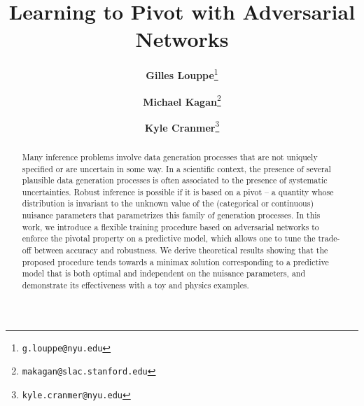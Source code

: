 \documentclass[twocolumn,superscriptaddress,aps]{revtex4-1}
\theoremstyle{plain}
\begin{document}

\title{\Large{Learning to Pivot with Adversarial Networks}}
\vspace{1cm}
\author{\small{\bf Gilles Louppe}\thanks{\texttt{g.louppe@nyu.edu}}}
\author{\small{\bf Michael Kagan}\thanks{\texttt{makagan@slac.stanford.edu}}}
\author{\small{\bf Kyle Cranmer}\thanks{\texttt{kyle.cranmer@nyu.edu}}}

\begin{abstract}

Many inference problems involve data generation processes that are not uniquely
specified or are uncertain in some way. In a scientific context, the presence of
several plausible data generation processes is often associated to the presence
of systematic uncertainties. Robust inference is possible if it is based on a
pivot -- a quantity whose distribution is invariant to the unknown value of the
(categorical or continuous)
nuisance parameters that parametrizes this family of generation processes. In
this work, we introduce a flexible training procedure based on adversarial networks to enforce the pivotal
property on a predictive model, which allows one to tune the trade-off between
accuracy and robustness. We derive theoretical
results showing that the proposed procedure tends towards a minimax solution corresponding to a predictive model
that is both optimal and independent on the nuisance parameters, and demonstrate
its effectiveness  with a toy and physics examples.


\end{abstract}
\end{document}
